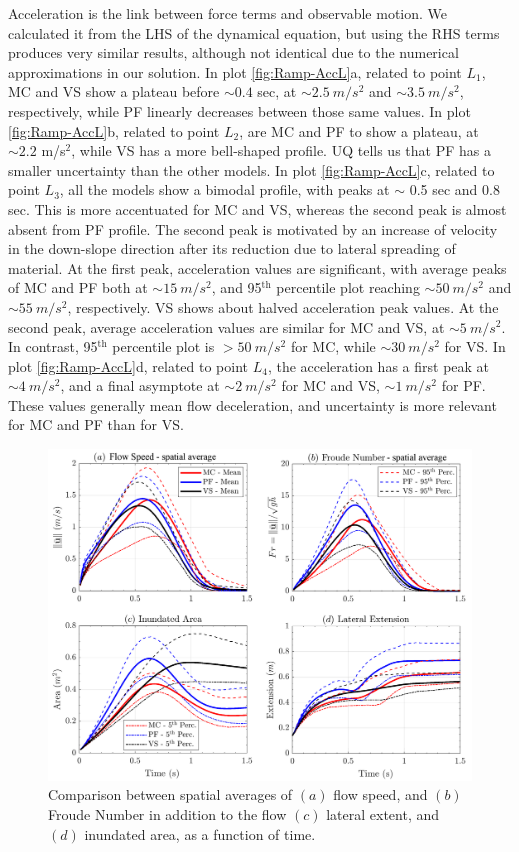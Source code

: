 \documentclass{article}
\begin{document}
Acceleration is the link between force terms and observable motion. We calculated it from the LHS of the dynamical equation, but using the RHS terms produces very similar results, although not identical due to the numerical approximations in our solution. In plot \ref{fig:Ramp-AccL}a, related to point $L_1$, MC and VS show a plateau before $\sim 0.4$ sec, at $\sim 2.5 \ m/s^2$ and $\sim 3.5 \ m/s^2$, respectively, while PF linearly decreases between those same values. In plot \ref{fig:Ramp-AccL}b, related to point $L_2$, are MC and PF to show a plateau, at $\sim 2.2$ m/s$^2$, while VS has a more bell-shaped profile. UQ tells us that PF has a smaller uncertainty than the other models. In plot \ref{fig:Ramp-AccL}c, related to point $L_3$, all the models show a bimodal profile, with peaks at $\sim$ 0.5 sec and 0.8 sec. This is more accentuated for MC and VS, whereas the second peak is almost absent from PF profile. The second peak is motivated by an increase of velocity in the down-slope direction after its reduction due to lateral spreading of material. At the first peak, acceleration values are significant, with average peaks of MC and PF both at $\sim 15 \ m/s^2$, and 95$^{\mathrm{th}}$ percentile plot reaching $\sim 50 \ m/s^2$ and $\sim 55 \ m/s^2$, respectively. VS shows about halved acceleration peak values. At the second peak, average acceleration values are similar for MC and VS, at $\sim 5 \ m/s^2$. In contrast, 95$^{\mathrm{th}}$ percentile plot is $> 50 \ m/s^2$ for MC, while $\sim 30 \ m/s^2$ for VS. In plot \ref{fig:Ramp-AccL}d, related to point $L_4$, the acceleration has a first peak at $\sim 4 \ m/s^2$, and a final asymptote at $\sim 2 \ m/s^2$ for MC and VS, $\sim 1 \ m/s^2$ for PF. These values generally mean flow deceleration, and uncertainty is more relevant for MC and PF than for VS.
\begin{figure}[H]
        \centering
        \includegraphics[width=1\textwidth]{InclinedPlane/AveragedMeasurments/Averaged_MeasuresIncline.png}
        \caption{Comparison between spatial averages of $(a)$ flow speed, and $(b)$ Froude Number in addition to the flow $(c)$ lateral extent, and $(d)$ inundated area, as a function of time.}
        \label{fig:Ramp-spatial}
\end{figure}
\end{document}
